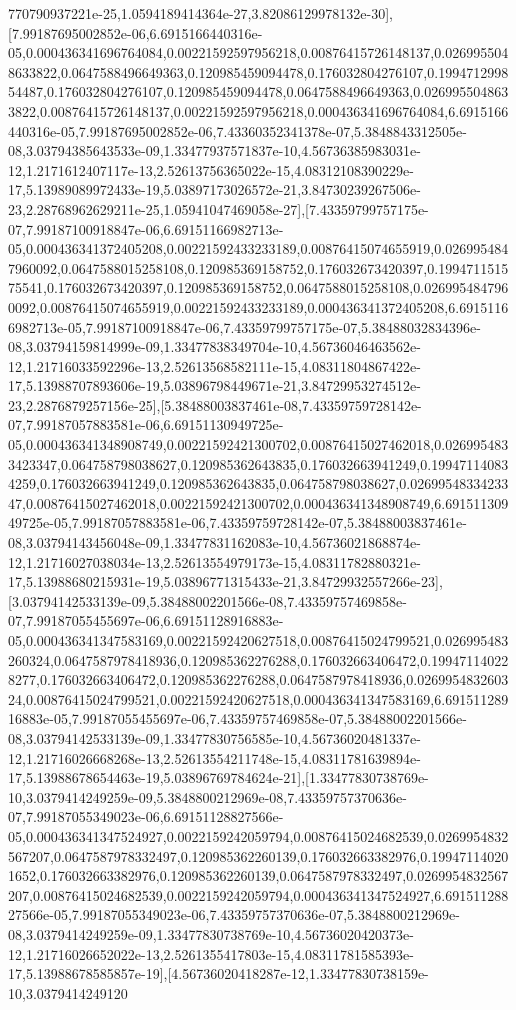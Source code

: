 \documentclass{article}
\begin{document}
770790937221e-25,1.0594189414364e-27,3.82086129978132e-30],[7.99187695002852e-06,6.6915166440316e-05,0.000436341696764084,0.00221592597956218,0.00876415726148137,0.0269955048633822,0.0647588496649363,0.120985459094478,0.176032804276107,0.199471299854487,0.176032804276107,0.120985459094478,0.0647588496649363,0.0269955048633822,0.00876415726148137,0.00221592597956218,0.000436341696764084,6.6915166440316e-05,7.99187695002852e-06,7.43360352341378e-07,5.3848843312505e-08,3.03794385643533e-09,1.33477937571837e-10,4.56736385983031e-12,1.2171612407117e-13,2.52613756365022e-15,4.08312108390229e-17,5.13989089972433e-19,5.03897173026572e-21,3.84730239267506e-23,2.28768962629211e-25,1.05941047469058e-27],[7.43359799757175e-07,7.99187100918847e-06,6.69151166982713e-05,0.000436341372405208,0.00221592433233189,0.00876415074655919,0.0269954847960092,0.0647588015258108,0.120985369158752,0.176032673420397,0.199471151575541,0.176032673420397,0.120985369158752,0.0647588015258108,0.0269954847960092,0.00876415074655919,0.00221592433233189,0.000436341372405208,6.69151166982713e-05,7.99187100918847e-06,7.43359799757175e-07,5.38488032834396e-08,3.03794159814999e-09,1.33477838349704e-10,4.56736046463562e-12,1.21716033592296e-13,2.52613568582111e-15,4.08311804867422e-17,5.13988707893606e-19,5.03896798449671e-21,3.84729953274512e-23,2.2876879257156e-25],[5.38488003837461e-08,7.43359759728142e-07,7.99187057883581e-06,6.69151130949725e-05,0.000436341348908749,0.00221592421300702,0.00876415027462018,0.0269954833423347,0.064758798038627,0.120985362643835,0.176032663941249,0.199471140834259,0.176032663941249,0.120985362643835,0.064758798038627,0.0269954833423347,0.00876415027462018,0.00221592421300702,0.000436341348908749,6.69151130949725e-05,7.99187057883581e-06,7.43359759728142e-07,5.38488003837461e-08,3.03794143456048e-09,1.33477831162083e-10,4.56736021868874e-12,1.21716027038034e-13,2.52613554979173e-15,4.08311782880321e-17,5.13988680215931e-19,5.03896771315433e-21,3.84729932557266e-23],[3.03794142533139e-09,5.38488002201566e-08,7.43359757469858e-07,7.99187055455697e-06,6.69151128916883e-05,0.000436341347583169,0.00221592420627518,0.00876415024799521,0.026995483260324,0.0647587978418936,0.120985362276288,0.176032663406472,0.199471140228277,0.176032663406472,0.120985362276288,0.0647587978418936,0.026995483260324,0.00876415024799521,0.00221592420627518,0.000436341347583169,6.69151128916883e-05,7.99187055455697e-06,7.43359757469858e-07,5.38488002201566e-08,3.03794142533139e-09,1.33477830756585e-10,4.56736020481337e-12,1.21716026668268e-13,2.52613554211748e-15,4.08311781639894e-17,5.13988678654463e-19,5.03896769784624e-21],[1.33477830738769e-10,3.0379414249259e-09,5.3848800212969e-08,7.43359757370636e-07,7.99187055349023e-06,6.69151128827566e-05,0.000436341347524927,0.0022159242059794,0.00876415024682539,0.0269954832567207,0.0647587978332497,0.120985362260139,0.176032663382976,0.199471140201652,0.176032663382976,0.120985362260139,0.0647587978332497,0.0269954832567207,0.00876415024682539,0.0022159242059794,0.000436341347524927,6.69151128827566e-05,7.99187055349023e-06,7.43359757370636e-07,5.3848800212969e-08,3.0379414249259e-09,1.33477830738769e-10,4.56736020420373e-12,1.21716026652022e-13,2.5261355417803e-15,4.08311781585393e-17,5.13988678585857e-19],[4.56736020418287e-12,1.33477830738159e-10,3.0379414249120
\end{document}
